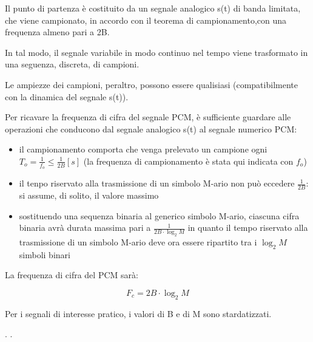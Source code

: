 Il punto di partenza è costituito da un segnale analogico s(t) di banda limitata, 
che viene campionato, in accordo con il teorema di campionamento,con una frequenza almeno pari a 2B. \newline 

In tal modo, il segnale variabile in modo continuo nel tempo viene trasformato in una seguenza, discreta, di campioni. \newline 

Le ampiezze dei campioni, peraltro, possono essere qualisiasi (compatibilmente con la dinamica del segnale s(t)). \newline 

Per ricavare la frequenza di cifra del segnale PCM, è sufficiente guardare alle operazioni che conducono dal segnale analogico s(t) al segnale numerico PCM: 

\begin{itemize}
    \item il campionamento comporta che venga prelevato un campione ogni $T_o = \frac{1}{f_o} \leq \frac{1}{2B} [s]$ (la frequenza di campionamento è stata qui indicata con $f_o$)
    \item il tenpo riservato alla trasmissione di un simbolo M-ario non può eccedere $\frac{1}{2B}$: si assume, di solito, il valore massimo 
    \item sostituendo una sequenza binaria al generico simbolo M-ario, ciascuna cifra binaria avrà durata massima pari a $\frac{1}{2B \cdot \log_2 M}$ in quanto il tempo riservato alla trasmissione di un simbolo M-ario deve ora essere ripartito tra i $\log_2 M$ simboli binari
\end{itemize}


La frequenza di cifra del PCM sarà: 

{
    \Large 
    \begin{equation}
        F_c = 2B \cdot \log_2 M
    \end{equation}
}

Per i segnali di interesse pratico, i valori di B e di M sono stardatizzati. \newline 

\newpage 
.
\newpage
.
\newpage
